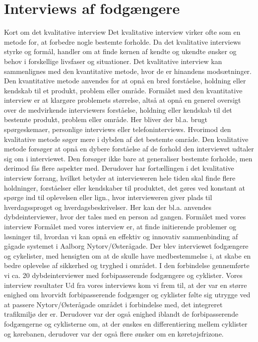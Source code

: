 \section{Interviews af fodgængere}
\label{sec:interviews_af_fger}
Kort om det kvalitative interview
Det kvalitative interview virker ofte som en metode for, at forbedre nogle bestemte forholde. Da det kvalitative interviews styrke og formål, handler om at finde kernen af kendte og ukendte ønsker og behov i forskellige livsfaser og situationer.
Det kvalitative interview kan sammenlignes med den kvantitative metode, hvor de er hinandens modsætninger. Den kvantitative metode anvendes for at opnå en bred forståelse, holdning eller kendskab til et produkt, problem eller område.  Formålet med den kvantitative interview er at klargøre problemets størrelse, altså at opnå en generel oversigt over de medvirkende interviewers forståelse, holdning eller kendskab til det bestemte produkt, problem eller område. Her bliver der bl.a. brugt spørgeskemaer, personlige interviews eller telefoninterviews. Hvorimod den kvalitative metode søger mere i dybden af det bestemte område. Den kvalitative metode forsøger at opnå en dybere forståelse af de forhold den interviewet udtaler sig om i interviewet. Den forsøger ikke bare at generaliser bestemte forholde, men derimod fås flere aspekter med. Derudover har fortællingen i det kvalitative interview forrang, hvilket betyder at intervieweren hele tiden skal finde flere holdninger, forståelser eller kendskaber til produktet, det gøres ved konstant at spørge ind til oplevelsen eller lign., hvor intervieweren giver plads til hverdagssproget og hverdagsbeskrivelser. Her kan der bl.a. anvendes dybdeinterviewer, hvor der tales med en person ad gangen.
Formålet med vores interview
Formålet med vores interview er, at finde initierende problemer og løsninger til, hvordan vi kan opnå en effektiv og innovativ sammenbinding af gågade systemet i Aalborg Nytorv/Østerågade. Der blev interviewet fodgængere og cykelister, med hensigten om at de skulle have medbestemmelse i, at skabe en bedre oplevelse af sikkerhed og tryghed i området. I den forbindelse gennemførte vi ca. 20 dybdeinterviewer med forbipasserende fodgængere og cyklister.
Vores interview resultater
Ud fra vores interviews kom vi frem til, at der var en større enighed om hvorvidt forbipasserende fodgænger og cyklister følte sig utrygge ved at passere Nytorv/Østerågade området i forbindelse med, det integreret trafikmiljø der er. Derudover var der også enighed iblandt de forbipasserende fodgængerne og cyklisterne om, at der ønskes en differentiering mellem cyklister og kørebanen, derudover var der også flere ønsker om en køretøjsfrizone.
